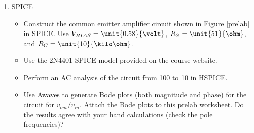 \documentclass{article}
\begin{document}
\begin{enumerate}
\item
	SPICE
	\begin{itemize}
	\item Construct the common emitter amplifier circuit shown in Figure \ref{prelab} in SPICE. Use $V_{BIAS}=\unit{0.58}{\volt}$, $R_S=\unit{51}{\ohm}$, and $R_C=\unit{10}{\kilo\ohm}$. 

	\item Use the 2N4401 SPICE model provided on the course website.

	\item Perform an AC analysis of the circuit from \unit{100}{\hertz} to \unit{10}{\giga\hertz} in HSPICE.

	\item Use Awaves to generate Bode plots (both magnitude and phase) for the circuit for $v_{out}/v_{in}$. Attach the Bode plots to this prelab worksheet. Do the results agree with your hand calculations (check the pole frequencies)?

	\end{itemize}
	
\end{enumerate}
\end{document}
